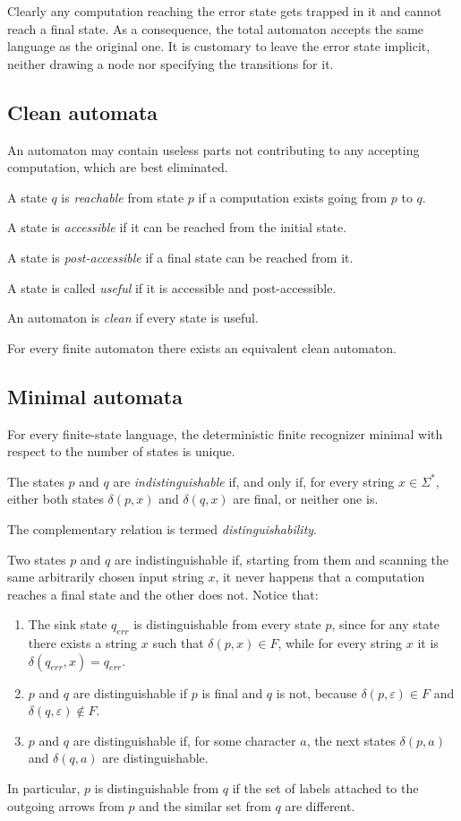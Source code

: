 Clearly any computation reaching the error state gets trapped in it and cannot reach a final state. As a consequence, the total automaton accepts the same language as 
the original one. It is customary to leave the error state implicit, neither drawing a node nor specifying the transitions for it.

\subsection*{Clean automata}
An automaton may contain useless parts not contributing to any accepting computation, which are best eliminated.
\begin{definition}
    A state $q$ is \emph{reachable} from state $p$ if a computation exists going from $p$ to $q$.

    A state is \emph{accessible} if it can be reached from the initial state. 

    A state is \emph{post-accessible} if a final state can be reached from it. 

    A state is called \emph{useful} if it is accessible and post-accessible. 

    An automaton is \emph{clean} if every state is useful.
\end{definition}
For every finite automaton there exists an equivalent clean automaton.

\subsection*{Minimal automata}
For every finite-state language, the deterministic finite recognizer minimal with respect to the number of states is unique.
\begin{definition}
    The states $p$ and $q$ are \emph{indistinguishable} if, and only if, for every string $x \in \Sigma^{*}$, either both states $\delta(p,x)$ and $\delta(q,x)$ are 
    final, or neither one is. 
    
    The complementary relation is termed \emph{distinguishability}.
\end{definition}
Two states $p$ and $q$ are indistinguishable if, starting from them and scanning the same arbitrarily chosen input string $x$, it never happens that a computation 
reaches a final state and the other does not. Notice that: 
\begin{enumerate}
    \item The sink state $q_{err}$ is distinguishable from every state $p$, since for any state there exists a string $x$ such that $\delta(p,x) \in F$, while for 
        every string $x$ it is $\delta(q_{err},x)=q_{err}$. 
    \item $p$ and $q$ are distinguishable if $p$ is final and $q$ is not, because $\delta(p,\varepsilon)\in F$ and $\delta(q,\varepsilon) \notin F$. 
    \item $p$ and $q$ are distinguishable if, for some character $a$, the next states $\delta(p,a)$ and $\delta(q,a)$ are distinguishable.
\end{enumerate}
In particular, $p$ is distinguishable from $q$ if the set of labels attached to the outgoing arrows from $p$ and the similar set from $q$ are different. 

